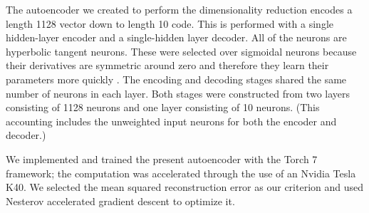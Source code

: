 The autoencoder we created to perform the dimensionality reduction encodes a
length 1128 vector down to length 10 code. This is performed with a single
hidden-layer encoder and a single-hidden layer decoder. All of the neurons are
hyperbolic tangent neurons. These were selected over sigmoidal neurons because
their derivatives are symmetric around zero and therefore they learn their
parameters more quickly \cite{sibi2013analysis}. The encoding and decoding
stages shared the same number of neurons in each layer. Both stages were
constructed from two layers consisting of 1128 neurons and one layer
consisting  of 10 neurons. (This accounting includes the unweighted input neurons for both the encoder and decoder.)

We implemented and trained the present autoencoder with the Torch 7
\cite{collobert2011torch7} framework; the computation was accelerated through
the use of an Nvidia Tesla K40. We selected the mean squared reconstruction
error as our criterion and used Nesterov accelerated gradient descent
\cite{nesterov2007gradient} to optimize it.